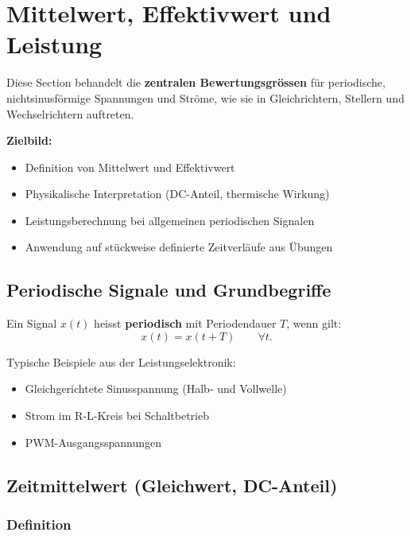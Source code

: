 \section{Mittelwert, Effektivwert und Leistung}

Diese Section behandelt die \textbf{zentralen Bewertungsgrössen} für periodische, nichtsinusförmige Spannungen und Ströme,
wie sie in Gleichrichtern, Stellern und Wechselrichtern auftreten.

\smallskip

\textbf{Zielbild:}
\begin{itemize}
    \item Definition von Mittelwert und Effektivwert
    \item Physikalische Interpretation (DC-Anteil, thermische Wirkung)
    \item Leistungsberechnung bei allgemeinen periodischen Signalen
    \item Anwendung auf stückweise definierte Zeitverläufe aus Übungen
\end{itemize}

\subsection{Periodische Signale und Grundbegriffe}

Ein Signal $x(t)$ heisst \textbf{periodisch} mit Periodendauer $T$, wenn gilt:
\[
x(t) = x(t+T) \qquad \forall t.
\]

Typische Beispiele aus der Leistungselektronik:
\begin{itemize}
    \item Gleichgerichtete Sinusspannung (Halb- und Vollwelle)
    \item Strom im R-L-Kreis bei Schaltbetrieb
    \item PWM-Ausgangsspannungen
\end{itemize}


\subsection{Zeitmittelwert (Gleichwert, DC-Anteil)}

\subsubsection{Definition}

